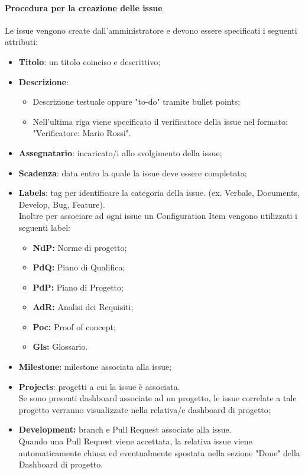 \hypertarget{par:proceduraCreazioneIssue}{\paragraph*{Procedura per la creazione delle issue}}
Le issue vengono create dall'amministratore e devono essere specificati i seguenti attributi:
\begin{itemize}
    \item \textbf{Titolo}: un titolo coinciso e descrittivo;
    \item \textbf{Descrizione}:
    \begin{itemize}
        \item Descrizione testuale oppure "to-do" tramite bullet points;
        \item Nell'ultima riga viene specificato il verificatore della issue nel formato: "Verificatore: Mario Rossi".
    \end{itemize} 
    \item \textbf{Assegnatario}: incaricato/i allo svolgimento della issue;
    \item \textbf{Scadenza}: data entro la quale la issue deve essere completata;
    \item \textbf{Labels}: tag per identificare la categoria della issue. (ex. Verbale, Documents, Develop, Bug, Feature).\\
    Inoltre per associare ad ogni issue un Configuration Item vengono utilizzati i seguenti label:
    \begin{itemize}
        \item \textbf{NdP:} Norme di progetto;
        \item \textbf{PdQ:} Piano di Qualifica;
        \item \textbf{PdP:} Piano di Progetto;
        \item \textbf{AdR:} Analisi dei Requisiti;
        \item \textbf{Poc:} Proof of concept;
        \item \textbf{Gls:} Glossario.
    \end{itemize}
    \item \textbf{Milestone}: milestone associata alla issue;
    \item \textbf{Projects}: progetti a cui la issue è associata. \\
    Se sono presenti dashboard associate ad un progetto, le issue correlate a tale progetto verranno visualizzate nella relativa/e dashboard di progetto;
    \item \textbf{Development:} branch e Pull Request associate alla issue. \\
    Quando una Pull Request viene accettata, la relativa issue viene automaticamente chiusa ed eventualmente spostata nella sezione "Done" della Dashboard di progetto.
\end{itemize}

